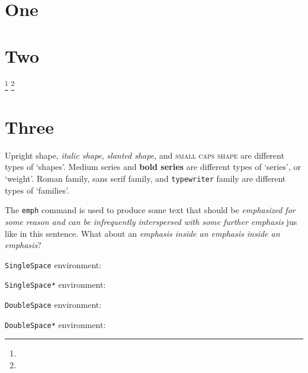 \documentclass[draft,showtrims]{memoir}
\begin{document}
\chapter{One}

\chapter{Two}
\lipsum[1-2]
\marginpar{\raggedright\small\lipsum[9][1]}\footnote{\lipsum[10][1]}
\lipsum[3-8]
\marginpar{\raggedright\small\lipsum[9][1]}\footnote{\lipsum[10][1]}

\chapter{Three}

\textup{Upright shape}, \textit{italic shape}, \textsl{slanted shape}, and
\textsc{small caps shape} are different types of `shapes'.
\textmd{Medium series} and \textbf{bold series} are different types of
`series', or `weight'.
\textrm{Roman family}, \textsf{sans serif family}, and \texttt{typewriter}
family are different types of `families'.

The \verb|emph| command is used to produce some text that should be
\emph{emphasized for some reason and can be \emph{infrequently interspersed}
with some further emphasis} jus like in this sentence.
What about an \emph{emphasis inside \emph{an emphasis inside \emph{an
emphasis}}}?

\texttt{SingleSpace} environment:\par
\begin{SingleSpace}
  \lipsum[1-2]
\end{SingleSpace}
\lipsum[3]

\texttt{SingleSpace*} environment:\par
\begin{SingleSpace*}
  \lipsum[1-2]
\end{SingleSpace*}
\lipsum[3]

\texttt{DoubleSpace} environment:\par
\begin{DoubleSpace}
  \lipsum[1-2]
\end{DoubleSpace}
\lipsum[3]

\texttt{DoubleSpace*} environment:\par
\begin{DoubleSpace*}
  \lipsum[1-2]
\end{DoubleSpace*}
\lipsum[3]

\end{document}
